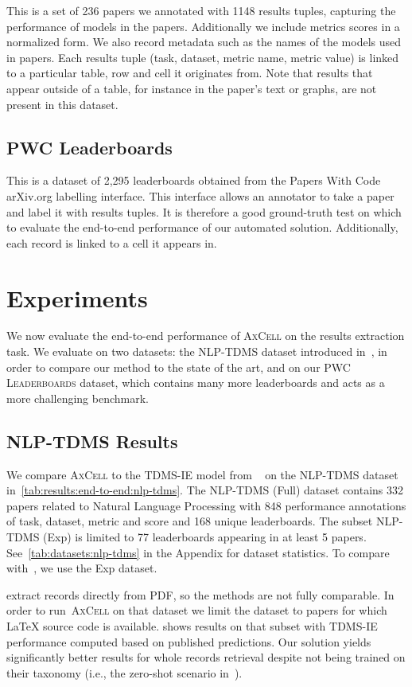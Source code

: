 \documentclass[11pt,a4paper]{article}
\newcommand{\model}{\textsc{AxCell}}
\newcommand{\leaderboards}{\textsc{PWC Leaderboards}}
\newcommand{\arxiv}{arXiv.org}
\begin{document}
This is a set of 236 papers we annotated with 1148 results tuples, capturing the performance of models in the papers. Additionally we include metrics scores in a normalized form. We also record metadata such as the names of the models used in papers. Each results tuple (task, dataset, metric name, metric value) is linked to a particular table, row and cell it originates from. Note that results that appear outside of a table, for instance in the paper's text or graphs, are not present in this dataset.

\subsection{PWC Leaderboards}

This is a dataset of 2,295 leaderboards obtained from the Papers With Code \arxiv{} labelling interface. This interface allows an annotator to take a paper and label it with results tuples. It is therefore a good ground-truth test on which to evaluate the end-to-end performance of our automated solution.
Additionally, each record is linked to a cell it appears in.
 \section{Experiments}
We now evaluate the end-to-end performance of \model{} on the results extraction task. We evaluate on two datasets: the NLP-TDMS dataset introduced in~\citet{ibm-extraction}, in order to compare our method to the state of the art, and on our \leaderboards{} dataset, which contains many more leaderboards and acts as a more challenging benchmark. 

\subsection{NLP-TDMS Results}

We compare \model{} to the TDMS-IE model from ~\citet{ibm-extraction} on the NLP-TDMS dataset in~\cref{tab:results:end-to-end:nlp-tdms}. The NLP-TDMS (Full) dataset contains 332 papers related to Natural Language Processing with 848 performance annotations of task, dataset, metric and score and 168 unique leaderboards. The subset NLP-TDMS (Exp) is limited to 77 leaderboards appearing in at least 5 papers. See~\cref{tab:datasets:nlp-tdms} in the Appendix for dataset statistics. To compare with~\citet{ibm-extraction}, we use the Exp dataset.

\citet{ibm-extraction} extract records directly from PDF, so the methods are not fully comparable. In order to run~\model{} on that dataset we limit the dataset to papers for which \LaTeX{} source code is available.
 shows results on that subset with TDMS-IE performance computed based on published predictions. Our solution yields significantly better results for whole records retrieval despite not being trained on their taxonomy (i.e., the zero-shot scenario in~\citet{ibm-extraction}).
\end{document}
